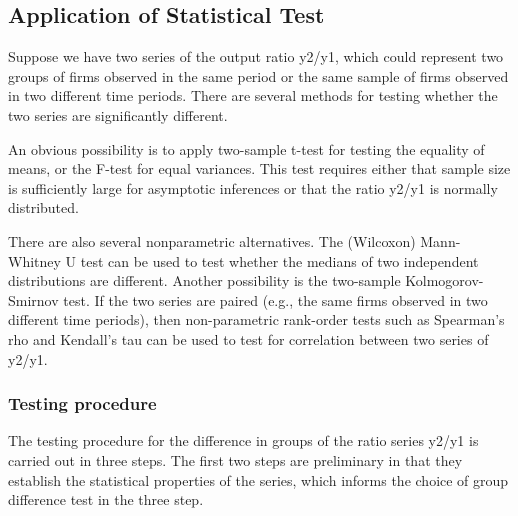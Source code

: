 \documentclass[
  12pt,
]{article}
\begin{document}
\hypertarget{application-of-statistical-test}{%
\subsection{Application of Statistical Test}\label{application-of-statistical-test}}

Suppose we have two series of the output ratio y2/y1, which could represent two groups of firms observed in the same period or the same sample of firms observed in two different time periods. There are several methods for testing whether the two series are significantly different.

An obvious possibility is to apply two-sample t-test for testing the equality of means, or the F-test for equal variances. This test requires either that sample size is sufficiently large for asymptotic inferences or that the ratio y2/y1 is normally distributed.

There are also several nonparametric alternatives. The (Wilcoxon) Mann-Whitney U test can be used to test whether the medians of two independent distributions are different. Another possibility is the two-sample Kolmogorov-Smirnov test. If the two series are paired (e.g., the same firms observed in two different time periods), then non-parametric rank-order tests such as Spearman's rho and Kendall's tau can be used to test for correlation between two series of y2/y1.

\hypertarget{TestSteps}{%
\subsubsection{Testing procedure}\label{TestSteps}}

The testing procedure for the difference in groups of the ratio series y2/y1 is carried out in three steps. The first two steps are preliminary in that they establish the statistical properties of the series, which informs the choice of group difference test in the three step.
\end{document}
